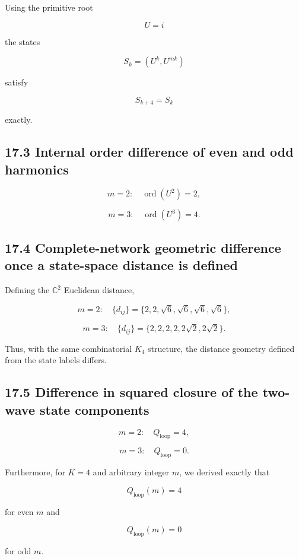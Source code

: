 \documentclass[
  a4paper,
]{article}
\begin{document}
Using the primitive root

\[
U=i
\]

the states

\[
S_k=(U^k,U^{mk})
\]

satisfy

\[
S_{k+4}=S_k
\]

exactly.

\subsection{17.3 Internal order difference of even and odd
harmonics}\label{internal-order-difference-of-even-and-odd-harmonics}

\[
m=2:
\quad
\operatorname{ord}(U^2)=2,
\]

\[
m=3:
\quad
\operatorname{ord}(U^3)=4.
\]

\subsection{17.4 Complete-network geometric difference once a
state-space distance is
defined}\label{complete-network-geometric-difference-once-a-state-space-distance-is-defined}

Defining the \(\mathbb C^2\) Euclidean distance,

\[
m=2:
\quad
\{d_{ij}\}
=
\{2,2,\sqrt6,\sqrt6,\sqrt6,\sqrt6\},
\]

\[
m=3:
\quad
\{d_{ij}\}
=
\{2,2,2,2,2\sqrt2,2\sqrt2\}.
\]

Thus, with the same combinatorial \(K_4\) structure, the distance
geometry defined from the state labels differs.

\subsection{17.5 Difference in squared closure of the two-wave state
components}\label{difference-in-squared-closure-of-the-two-wave-state-components}

\[
m=2:
\quad
Q_{\mathrm{loop}}=4,
\]

\[
m=3:
\quad
Q_{\mathrm{loop}}=0.
\]

Furthermore, for \(K=4\) and arbitrary integer \(m\), we derived exactly
that

\[
Q_{\mathrm{loop}}(m)
=
4
\]

for even \(m\) and

\[
Q_{\mathrm{loop}}(m)
=
0
\]

for odd \(m\).
\end{document}
